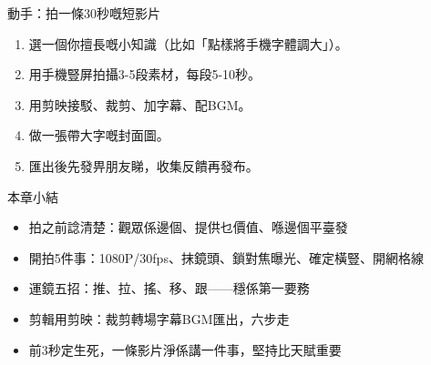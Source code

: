 \begin{tcbpractice}{動手：拍一條30秒嘅短影片}
\begin{enumerate}
  \item 選一個你擅長嘅小知識（比如「點樣將手機字體調大」）。
  \item 用手機豎屏拍攝3-5段素材，每段5-10秒。
  \item 用剪映接駁、裁剪、加字幕、配BGM。
  \item 做一張帶大字嘅封面圖。
  \item 匯出後先發畀朋友睇，收集反饋再發布。
\end{enumerate}

\end{tcbpractice}

\begin{tcbsummary}{本章小結}
\begin{itemize}
  \item 拍之前諗清楚：觀眾係邊個、提供乜價值、喺邊個平臺發
  \item 開拍5件事：1080P/30fps、抹鏡頭、鎖對焦曝光、確定橫豎、開網格線
  \item 運鏡五招：推、拉、搖、移、跟——穩係第一要務
  \item 剪輯用剪映：裁剪轉場字幕BGM匯出，六步走
  \item 前3秒定生死，一條影片淨係講一件事，堅持比天賦重要
\end{itemize}

\end{tcbsummary}
